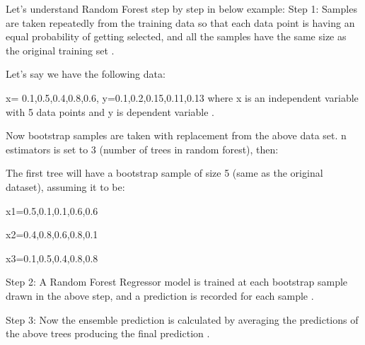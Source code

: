 \documentclass[]{llncs} %
\begin{document}
Let's understand Random Forest step by step in below example:
Step 1: Samples are taken repeatedly from the training data so that each data point is having an equal probability of getting selected, and all the samples have the same size as the original training set \cite{RandomForest}.\par
Let's say we have the following data:\par
x= 0.1,0.5,0.4,0.8,0.6, y=0.1,0.2,0.15,0.11,0.13 where x is an independent variable with 5 data points and y is dependent variable \cite{RandomForest}.\par
Now bootstrap samples are taken with replacement from the above data set. n estimators is set to 3 (number of trees in random forest), then:\par
The first tree will have a bootstrap sample of size 5 (same as the original dataset), assuming it to be: \par
x1={0.5,0.1,0.1,0.6,0.6}\par
x2={0.4,0.8,0.6,0.8,0.1}\par
x3={0.1,0.5,0.4,0.8,0.8}\par
Step 2: A Random Forest Regressor model is trained at each bootstrap sample drawn in the above step, and a prediction is recorded for each sample \cite{RandomForest}.\par
Step 3: Now the ensemble prediction is calculated by averaging the predictions of the above trees producing the final prediction \cite{RandomForest}.\par
\end{document}
